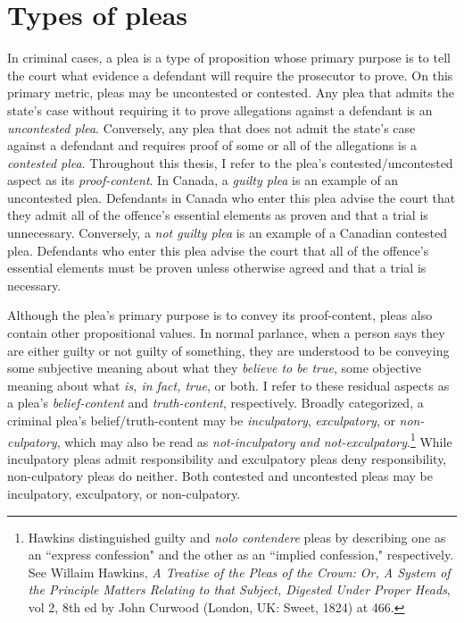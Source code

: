 \section{Types of pleas}

In criminal cases, a plea is a type of proposition whose primary purpose is to tell the court what evidence a defendant will require the prosecutor to prove. On this primary metric, pleas may be uncontested or contested. Any plea that admits the state's case without requiring it to prove allegations against a defendant is an \textit{uncontested plea}. Conversely, any plea that does not admit the state's case against a defendant and requires proof of some or all of the allegations is a \textit{contested plea}. Throughout this thesis, I refer to the plea's contested/uncontested aspect as its \textit{proof-content}. In Canada, a \textit{guilty plea} is an example of an uncontested plea. Defendants in Canada who enter this plea advise the court that they admit all of the offence's essential elements as proven and that a trial is unnecessary. Conversely, a \textit{not guilty plea} is an example of a Canadian contested plea. Defendants who enter this plea advise the court that all of the offence's essential elements must be proven unless otherwise agreed and that a trial is necessary.

Although the plea's primary purpose is to convey its proof-content, pleas also contain other propositional values. In normal parlance, when a person says they are either guilty or not guilty of something, they are understood to be conveying some subjective meaning about what they \textit{believe to be true}, some objective meaning about what \textit{is, in fact, true}, or both. I refer to these residual aspects as a plea's \textit{belief-content} and \textit{truth-content}, respectively. Broadly categorized, a criminal plea's belief/truth-content may be \textit{inculpatory}, \textit{exculpatory}, or \textit{non-culpatory}, which may also be read as \textit{not-inculpatory and not-exculpatory}.\footnote{Hawkins distinguished guilty and \textit{nolo contendere} pleas by describing one as an ``express confession" and the other as an ``implied confession," respectively. See Willaim Hawkins, \textit{A Treatise of the Pleas of the Crown: Or, A System of the Principle Matters Relating to that Subject, Digested Under Proper Heads}, vol 2, 8th ed by John Curwood (London, UK: Sweet, 1824) at 466.} While inculpatory pleas admit responsibility and exculpatory pleas deny responsibility, non-culpatory pleas do neither. Both contested and uncontested pleas may be inculpatory, exculpatory, or non-culpatory.
    
